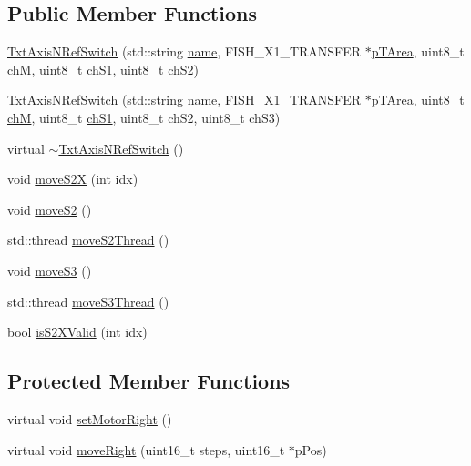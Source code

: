 \subsection*{Public Member Functions}
\begin{DoxyCompactItemize}
\item 
\hyperlink{classft_1_1_txt_axis_n_ref_switch_a614a6e2df3c9e575faedd582321e08d2}{Txt\+Axis\+N\+Ref\+Switch} (std\+::string \hyperlink{classft_1_1_txt_axis_a358af2b2ed1709b40ab6c9768c2795ef}{name}, F\+I\+S\+H\+\_\+\+X1\+\_\+\+T\+R\+A\+N\+S\+F\+ER $\ast$\hyperlink{classft_1_1_txt_axis_ae5521c2eda7b80599ed6340f6a8192f2}{p\+T\+Area}, uint8\+\_\+t \hyperlink{classft_1_1_txt_axis_a3a8988acb2f578fe96312221205c50c4}{chM}, uint8\+\_\+t \hyperlink{classft_1_1_txt_axis_a9b155580a8dcc876c8e0c4b9c92041e7}{ch\+S1}, uint8\+\_\+t ch\+S2)
\item 
\hyperlink{classft_1_1_txt_axis_n_ref_switch_ab27b2a2b57e61bd9e5f85e3b4d31d74e}{Txt\+Axis\+N\+Ref\+Switch} (std\+::string \hyperlink{classft_1_1_txt_axis_a358af2b2ed1709b40ab6c9768c2795ef}{name}, F\+I\+S\+H\+\_\+\+X1\+\_\+\+T\+R\+A\+N\+S\+F\+ER $\ast$\hyperlink{classft_1_1_txt_axis_ae5521c2eda7b80599ed6340f6a8192f2}{p\+T\+Area}, uint8\+\_\+t \hyperlink{classft_1_1_txt_axis_a3a8988acb2f578fe96312221205c50c4}{chM}, uint8\+\_\+t \hyperlink{classft_1_1_txt_axis_a9b155580a8dcc876c8e0c4b9c92041e7}{ch\+S1}, uint8\+\_\+t ch\+S2, uint8\+\_\+t ch\+S3)
\item 
virtual \hyperlink{classft_1_1_txt_axis_n_ref_switch_a559cde62e5b9192fd634216ec1921801}{$\sim$\+Txt\+Axis\+N\+Ref\+Switch} ()
\item 
void \hyperlink{classft_1_1_txt_axis_n_ref_switch_aa663559c3da6e40a21185cfc4e6c573c}{move\+S2X} (int idx)
\item 
void \hyperlink{classft_1_1_txt_axis_n_ref_switch_aaee4c0ac6d1379639c40588ac3d58c63}{move\+S2} ()
\item 
std\+::thread \hyperlink{classft_1_1_txt_axis_n_ref_switch_a9152452c5b6f75b293ad83510e537cf4}{move\+S2\+Thread} ()
\item 
void \hyperlink{classft_1_1_txt_axis_n_ref_switch_a91a91446c84f2e6be47394ada3c3de0c}{move\+S3} ()
\item 
std\+::thread \hyperlink{classft_1_1_txt_axis_n_ref_switch_a6abe7590af5db9c355fe7a263f5a787b}{move\+S3\+Thread} ()
\item 
bool \hyperlink{classft_1_1_txt_axis_n_ref_switch_abc4e26eee2563496af18d107aef1b38d}{is\+S2\+X\+Valid} (int idx)
\end{DoxyCompactItemize}
\subsection*{Protected Member Functions}
\begin{DoxyCompactItemize}
\item 
virtual void \hyperlink{classft_1_1_txt_axis_n_ref_switch_ae4938459dbc75af81d58aa3a2075baf4}{set\+Motor\+Right} ()
\item 
virtual void \hyperlink{classft_1_1_txt_axis_n_ref_switch_ae8bf5d862cabf4598371ebbbaa67a4f0}{move\+Right} (uint16\+\_\+t steps, uint16\+\_\+t $\ast$p\+Pos)
\end{DoxyCompactItemize}
